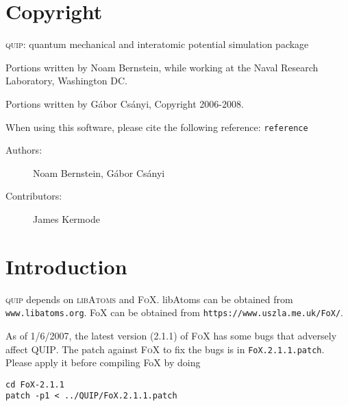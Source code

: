 \section{Copyright}

\textsc{quip}: quantum mechanical and interatomic potential simulation package

Portions written by Noam Bernstein, while working at the
Naval Research Laboratory, Washington DC. 

Portions written by G\'abor Cs\'anyi, Copyright 2006-2008.

When using this software,  please cite the following reference:
\texttt{reference}

\begin{description}
\item[Authors:] Noam Bernstein, G\'abor Cs\'anyi
\item[Contributors:] James Kermode
\end{description}

\section{Introduction}

\textsc{quip} depends on \textsc{libAtoms} and \textsc{FoX}.
libAtoms can be obtained from \texttt{www.libatoms.org}.
FoX can be obtained from \texttt{https://www.uszla.me.uk/FoX/}.

As of 1/6/2007, the latest version (2.1.1) of \textsc{FoX} has some
bugs that adversely affect \textsc{QUIP}.  The patch against
\textsc{FoX} to fix the bugs is in \texttt{FoX.2.1.1.patch}.  Please
apply it before compiling FoX by doing 

\begin{verbatim}
cd FoX-2.1.1
patch -p1 < ../QUIP/FoX.2.1.1.patch
\end{verbatim}


